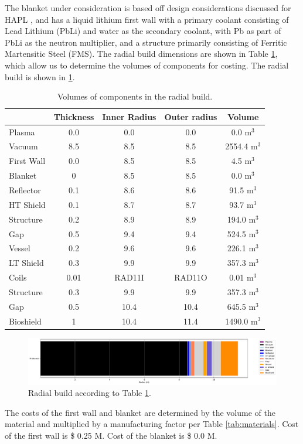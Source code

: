 The blanket under consideration is based off design considerations discussed for HAPL \cite{Raffray2006}, and has a liquid lithium first wall with a primary coolant consisting of Lead Lithium (PbLi) and water as the secondary coolant, with Pb as part of PbLi as the neutron multiplier, and a structure primarily consisting of Ferritic Martensitic Steel (FMS). The radial build dimensions are shown in Table \ref{tab:volumes}, which allow us to determine the volumes of components for costing.  The radial build is shown in \ref{fig:radial}.  \\


\begin{table}[h!]
    \centering
    \begin{tabular}{l c  c c c}
    \hline
        &	Thickness	&	Inner Radius	&	Outer radius	&	Volume		\\
        \hline
Plasma	&	0.0	&	0.0	&	0.0	&	0.0	m$^{3}$	\\
Vacuum	&	8.5	&	8.5	&	8.5	&	2554.4	m$^{3}$	\\
First Wall	&	0.0	&	8.5	&	8.5	&	4.5	m$^{3}$	\\
Blanket	&	0	&	8.5	&	8.5	&	0.0	m$^{3}$	\\
Reflector	&	0.1	&	8.6	&	8.6	&	91.5	m$^{3}$	\\
HT Shield	&	0.1	&	8.7	&	8.7	&	93.7	m$^{3}$	\\
Structure	&	0.2	&	8.9	&	8.9	&	194.0	m$^{3}$	\\
Gap	&	0.5	&	9.4	&	9.4	&	524.5	m$^{3}$	\\
Vessel	&	0.2	&	9.6	&	9.6	&	226.1	m$^{3}$	\\
LT Shield	&	0.3	&	9.9	&	9.9	&	357.3	m$^{3}$	\\
Coils	&	0.01	&	RAD11I	&	RAD11O	&	0.01	m$^{3}$	\\
Structure	&	0.3	&	9.9	&	9.9	&	357.3	m$^{3}$	\\
Gap	&	0.5	&	10.4	&	10.4	&	645.5	m$^{3}$	\\
Bioshield	&	1	&	10.4	&	11.4	&	1490.0	m$^{3}$	\\

        \hline
    \end{tabular}
    \caption{Volumes of components in the radial build.}
    \label{tab:volumes}
\end{table}

\begin{figure}
    \centering
    \includegraphics[width=0.9\linewidth]{Figures/radial_build.pdf}
    \caption{Radial build according to Table \ref{tab:volumes}.}
    \label{fig:radial}
\end{figure}



The costs of the first wall and blanket are determined by the volume of the material and multiplied by a manufacturing factor per Table \ref{tab:materials}.   Cost of the first wall is \$ 0.25 M.  Cost of the blanket is \$ 0.0 M.

